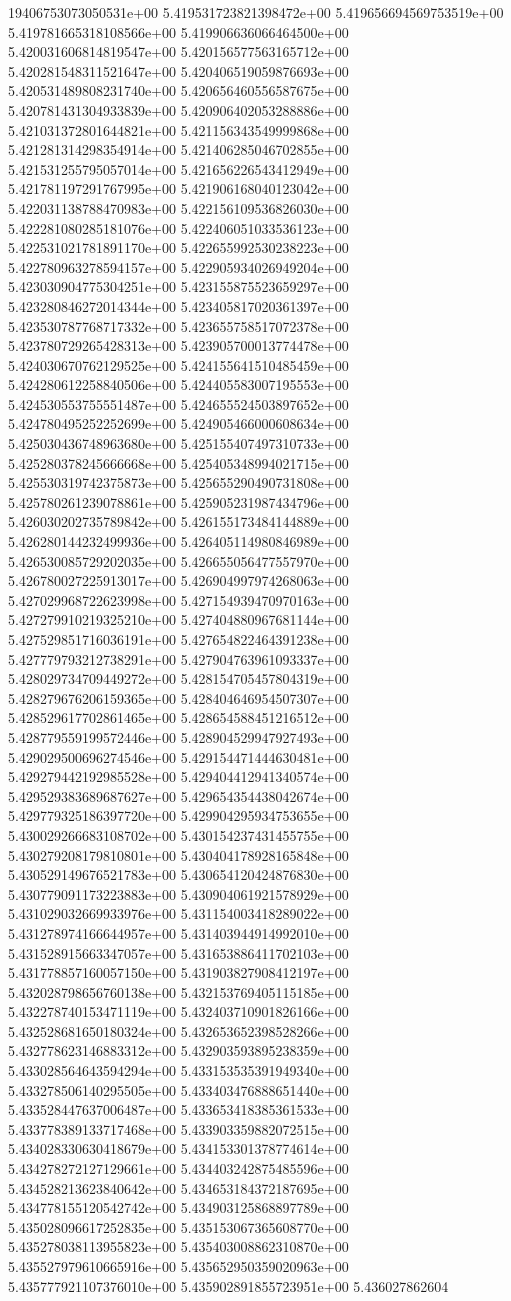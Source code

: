 19406753073050531e+00	5.419531723821398472e+00	5.419656694569753519e+00	5.419781665318108566e+00	5.419906636066464500e+00	5.420031606814819547e+00	5.420156577563165712e+00	5.420281548311521647e+00	5.420406519059876693e+00	5.420531489808231740e+00	5.420656460556587675e+00	5.420781431304933839e+00	5.420906402053288886e+00	5.421031372801644821e+00	5.421156343549999868e+00	5.421281314298354914e+00	5.421406285046702855e+00	5.421531255795057014e+00	5.421656226543412949e+00	5.421781197291767995e+00	5.421906168040123042e+00	5.422031138788470983e+00	5.422156109536826030e+00	5.422281080285181076e+00	5.422406051033536123e+00	5.422531021781891170e+00	5.422655992530238223e+00	5.422780963278594157e+00	5.422905934026949204e+00	5.423030904775304251e+00	5.423155875523659297e+00	5.423280846272014344e+00	5.423405817020361397e+00	5.423530787768717332e+00	5.423655758517072378e+00	5.423780729265428313e+00	5.423905700013774478e+00	5.424030670762129525e+00	5.424155641510485459e+00	5.424280612258840506e+00	5.424405583007195553e+00	5.424530553755551487e+00	5.424655524503897652e+00	5.424780495252252699e+00	5.424905466000608634e+00	5.425030436748963680e+00	5.425155407497310733e+00	5.425280378245666668e+00	5.425405348994021715e+00	5.425530319742375873e+00	5.425655290490731808e+00	5.425780261239078861e+00	5.425905231987434796e+00	5.426030202735789842e+00	5.426155173484144889e+00	5.426280144232499936e+00	5.426405114980846989e+00	5.426530085729202035e+00	5.426655056477557970e+00	5.426780027225913017e+00	5.426904997974268063e+00	5.427029968722623998e+00	5.427154939470970163e+00	5.427279910219325210e+00	5.427404880967681144e+00	5.427529851716036191e+00	5.427654822464391238e+00	5.427779793212738291e+00	5.427904763961093337e+00	5.428029734709449272e+00	5.428154705457804319e+00	5.428279676206159365e+00	5.428404646954507307e+00	5.428529617702861465e+00	5.428654588451216512e+00	5.428779559199572446e+00	5.428904529947927493e+00	5.429029500696274546e+00	5.429154471444630481e+00	5.429279442192985528e+00	5.429404412941340574e+00	5.429529383689687627e+00	5.429654354438042674e+00	5.429779325186397720e+00	5.429904295934753655e+00	5.430029266683108702e+00	5.430154237431455755e+00	5.430279208179810801e+00	5.430404178928165848e+00	5.430529149676521783e+00	5.430654120424876830e+00	5.430779091173223883e+00	5.430904061921578929e+00	5.431029032669933976e+00	5.431154003418289022e+00	5.431278974166644957e+00	5.431403944914992010e+00	5.431528915663347057e+00	5.431653886411702103e+00	5.431778857160057150e+00	5.431903827908412197e+00	5.432028798656760138e+00	5.432153769405115185e+00	5.432278740153471119e+00	5.432403710901826166e+00	5.432528681650180324e+00	5.432653652398528266e+00	5.432778623146883312e+00	5.432903593895238359e+00	5.433028564643594294e+00	5.433153535391949340e+00	5.433278506140295505e+00	5.433403476888651440e+00	5.433528447637006487e+00	5.433653418385361533e+00	5.433778389133717468e+00	5.433903359882072515e+00	5.434028330630418679e+00	5.434153301378774614e+00	5.434278272127129661e+00	5.434403242875485596e+00	5.434528213623840642e+00	5.434653184372187695e+00	5.434778155120542742e+00	5.434903125868897789e+00	5.435028096617252835e+00	5.435153067365608770e+00	5.435278038113955823e+00	5.435403008862310870e+00	5.435527979610665916e+00	5.435652950359020963e+00	5.435777921107376010e+00	5.435902891855723951e+00	5.436027862604